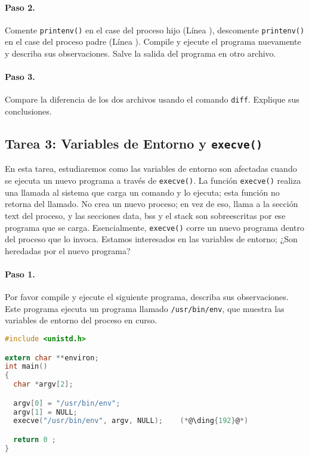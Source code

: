 \paragraph{Paso 2.} Comente {\tt printenv()} en el case del proceso hijo (Línea ), descomente {\tt printenv()} en el case del proceso padre (Línea ). Compile y ejecute el programa nuevamente y describa sus observaciones. Salve la salida del programa en otro archivo.


\paragraph{Paso 3.} Compare la diferencia de los dos archivos usando el comando 
 {\tt diff}. Explique sus conclusiones.



\subsection{Tarea 3: Variables de Entorno y {\tt execve()}}

En esta tarea, estudiaremos como las variables de entorno son afectadas cuando se ejecuta un nuevo programa a través de {\tt execve()}. La función {\tt execve()} realiza una llamada al sistema que carga un comando y lo ejecuta; esta función no retorna del llamado. No crea un nuevo proceso; en vez de eso, llama a la sección text del proceso, y las secciones data, bss y el stack son sobreescritas por ese programa que se carga. Esencialmente, {\tt execve()} corre un nuevo programa dentro del proceso que lo invoca. Estamos interesados en las variables de entorno; ¿Son heredadas por el nuevo programa?


\paragraph{Paso 1.} Por favor compile y ejecute el siguiente programa, describa sus observaciones. Este programa ejecuta un programa llamado \texttt{/usr/bin/env}, que muestra las variables de entorno del proceso en curso.

\begin{lstlisting}[language=C, caption=\texttt{myenv.c}]
#include <unistd.h>

extern char **environ;
int main()
{
  char *argv[2];

  argv[0] = "/usr/bin/env";
  argv[1] = NULL;
  execve("/usr/bin/env", argv, NULL);    (*@\ding{192}@*)

  return 0 ;
}
\end{lstlisting}


